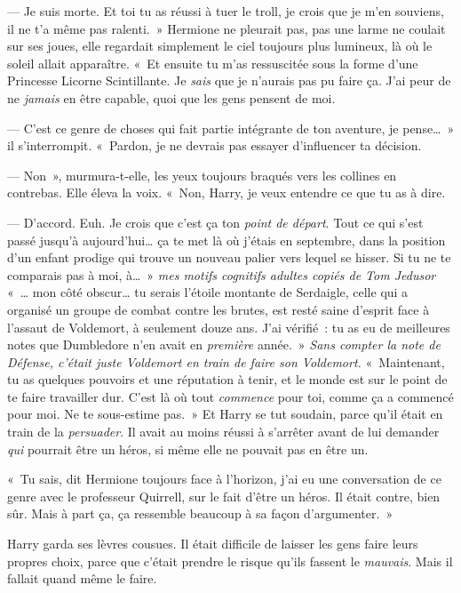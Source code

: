--- Je suis morte.
Et toi tu as réussi à tuer le troll, je crois que je m'en souviens, il ne t'a même pas ralenti.~»
Hermione ne pleurait pas, pas une larme ne coulait sur ses joues, elle regardait simplement le ciel toujours plus lumineux, là où le soleil allait apparaître.
«~Et ensuite tu m'as ressuscitée sous la forme d'une Princesse Licorne Scintillante.
Je \emph{sais} que je n'aurais pas pu faire ça.
J'ai peur de ne \emph{jamais} en être capable, quoi que les gens pensent de moi.

--- C'est ce genre de choses qui fait partie intégrante de ton aventure, je pense…~»
il s'interrompit.
«~Pardon, je ne devrais pas essayer d'influencer ta décision.

--- Non~», murmura-t-elle, les yeux toujours braqués vers les collines en contrebas.
Elle éleva la voix.
«~Non, Harry, je veux entendre ce que tu as à dire.

--- D'accord.
Euh. Je crois que c'est ça ton \emph{point de départ}.
Tout ce qui s'est passé jusqu'à aujourd'hui… ça te met là où j'étais en septembre, dans la position d'un enfant prodige qui trouve un nouveau palier vers lequel se hisser.
Si tu ne te comparais pas à moi, à…~»
\emph{mes motifs cognitifs adultes copiés de Tom Jedusor} «~… mon côté obscur… tu serais l'étoile montante de Serdaigle, celle qui a organisé un groupe de combat contre les brutes, est resté saine d'esprit face à l'assaut de Voldemort, à seulement douze ans.
J'ai vérifié~: tu as eu de meilleures notes que Dumbledore n'en avait en \emph{première} année.~»
\emph{Sans compter la note de Défense, c'était juste Voldemort en train de faire son Voldemort.} «~Maintenant, tu as quelques pouvoirs et une réputation à tenir, et le monde est sur le point de te faire travailler dur.
C'est là où tout \emph{commence} pour toi, comme ça a commencé pour moi.
Ne te sous-estime pas.~»
Et Harry se tut soudain, parce qu'il était en train de la \emph{persuader}.
Il avait au moins réussi à s'arrêter avant de lui demander \emph{qui} pourrait être un héros, si même elle ne pouvait pas en être un.

«~Tu sais, dit Hermione toujours face à l'horizon, j'ai eu une conversation de ce genre avec le professeur Quirrell, sur le fait d'être un héros.
Il était contre, bien sûr.
Mais à part ça, ça ressemble beaucoup à sa façon d'argumenter.~»

Harry garda ses lèvres cousues.
Il était difficile de laisser les gens faire leurs propres choix, parce que c'était prendre le risque qu'ils fassent le \emph{mauvais}.
Mais il fallait quand même le faire.

